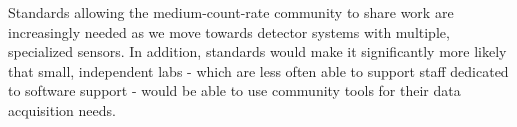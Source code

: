 \documentclass[11pt]{report}   %
\begin{document}
Standards allowing the medium-count-rate community to share work are increasingly needed as we move towards detector systems with multiple, specialized sensors.  In addition, standards would make it significantly more likely that small, independent labs - which are less often able to support staff dedicated to software support - would be able to use community tools for their data acquisition needs.  
\end{document}
